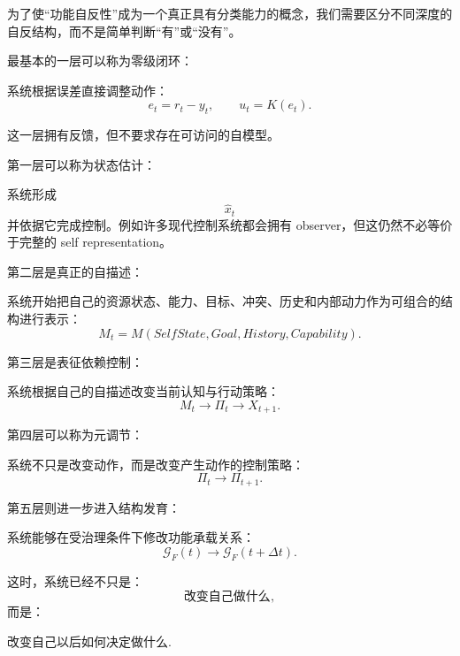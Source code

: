 为了使“功能自反性”成为一个真正具有分类能力的概念，我们需要区分不同深度的自反结构，而不是简单判断“有”或“没有”。

最基本的一层可以称为零级闭环：
\begin{statementbox}
\centering
{}
\end{statementbox}
系统根据误差直接调整动作：
\[
e_t=r_t-y_t,
\qquad
u_t=K(e_t).
\]

这一层拥有反馈，但不要求存在可访问的自模型。

第一层可以称为状态估计：
\begin{statementbox}
\centering
{}
\end{statementbox}
系统形成
\[
\hat x_t
\]
并依据它完成控制。例如许多现代控制系统都会拥有 observer，但这仍然不必等价于完整的 self representation。

第二层是真正的自描述：
\begin{statementbox}
\centering
{}
\end{statementbox}
系统开始把自己的资源状态、能力、目标、冲突、历史和内部动力作为可组合的结构进行表示：
\[
M_t=
M(
SelfState,
Goal,
History,
Capability
).
\]

第三层是表征依赖控制：
\begin{statementbox}
\centering
{}
\end{statementbox}
系统根据自己的自描述改变当前认知与行动策略：
\[
M_t
\rightarrow
\Pi_t
\rightarrow
X_{t+1}.
\]

第四层可以称为元调节：
\begin{statementbox}
\centering
{}
\end{statementbox}
系统不只是改变动作，而是改变产生动作的控制策略：
\[
\Pi_t
\rightarrow
\Pi_{t+1}.
\]

第五层则进一步进入结构发育：
\begin{statementbox}
\centering
{}
\end{statementbox}
系统能够在受治理条件下修改功能承载关系：
\[
\mathcal G_F(t)
\rightarrow
\mathcal G_F(t+\Delta t).
\]

这时，系统已经不只是：
\[
\text{改变自己做什么},
\]
而是：
\begin{statementbox}
改变自己以后如何决定做什么.
\end{statementbox}


